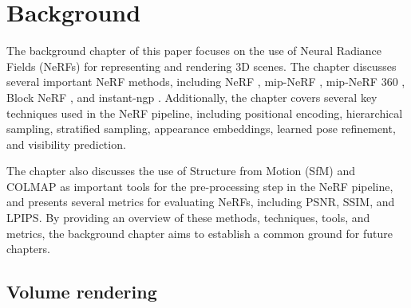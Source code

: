 \chapter{Background} \label{chap:relatedwork}

The background chapter of this paper focuses on the use of Neural Radiance Fields (NeRFs) for representing and rendering 3D scenes. The chapter discusses several important NeRF methods, including NeRF \cite{mildenhall_nerf_2020}, mip-NeRF \cite{barron_mip-nerf_2021}, mip-NeRF 360 \cite{barron_mip-nerf_2022}, Block NeRF \cite{tancik_block-nerf_2022}, and instant-ngp \cite{muller_instant_2022}. Additionally, the chapter covers several key techniques used in the NeRF pipeline, including positional encoding, hierarchical sampling, stratified sampling, appearance embeddings, learned pose refinement, and visibility prediction.

The chapter also discusses the use of Structure from Motion (SfM) and COLMAP \cite{schoenberger2016sfm} as important tools for the pre-processing step in the NeRF pipeline, and presents several metrics for evaluating NeRFs, including PSNR, SSIM, and LPIPS. By providing an overview of these methods, techniques, tools, and metrics, the background chapter aims to establish a common ground for future chapters.

\section{Volume rendering} \label{sec:volumerendering}

